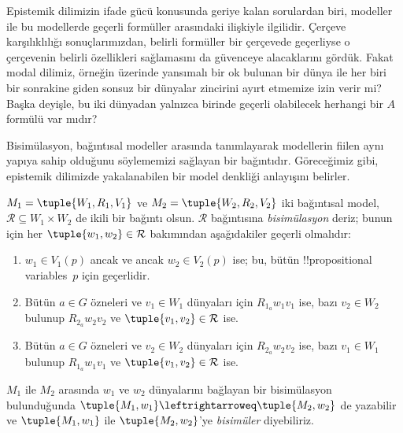



Epistemik dilimizin ifade gücü konusunda geriye kalan sorulardan biri,
modeller ile bu modellerde geçerli formüller arasındaki ilişkiyle ilgilidir.
Çerçeve karşılıklılığı sonuçlarımızdan, belirli formüller bir çerçevede
geçerliyse o çerçevenin belirli özellikleri sağlamasını da güvenceye
alacaklarını gördük. Fakat modal dilimiz, örneğin üzerinde yansımalı bir ok
bulunan bir dünya ile her biri bir sonrakine giden sonsuz bir dünyalar
zincirini ayırt etmemize izin verir mi? Başka deyişle, bu iki dünyadan
yalnızca birinde geçerli olabilecek herhangi bir $A$ formülü var mıdır?

Bisimülasyon, bağıntısal modeller arasında tanımlayarak modellerin fiilen aynı
yapıya sahip olduğunu söylememizi sağlayan bir bağıntıdır. Göreceğimiz gibi,
epistemik dilimizde yakalanabilen bir model denkliği anlayışını belirler.

\begin{defn}[Bisimülasyon]
$M_1 = \tuple{W_1, R_1, V_1}$ ve $M_2 = \tuple{W_2, R_2, V_2}$ iki
bağıntısal model, $\mathcal{R} \subseteq W_1 \times W_2$ de ikili bir bağıntı
olsun. $\mathcal{R}$ bağıntısına \emph{bisimülasyon} deriz; bunun için her
$\tuple{w_1, w_2} \in \mathcal{R}$ bakımından aşağıdakiler geçerli olmalıdır:

\begin{enumerate}
  \item $w_1 \in V_1(p)$ ancak ve ancak $w_2 \in V_2(p)$ ise; bu, bütün
  !!{propositional variable}s~$p$ için geçerlidir.
  \item Bütün $a \in G$ özneleri ve $v_1 \in W_1$ dünyaları için
  $R_{1_a} w_1 v_1$ ise, bazı $v_2 \in W_2$ bulunup $R_{2_a} w_2 v_2$ ve
  $\tuple{v_1, v_2} \in \mathcal{R}$ ise.
  \item Bütün $a \in G$ özneleri ve $v_2 \in W_2$ dünyaları için
   $R_{2_a} w_2 v_2$ ise, bazı $v_1 \in W_1$ bulunup $R_{1_a} w_1 v_1$ ve
   $\tuple{v_1, v_2} \in \mathcal{R}$ ise.
\end{enumerate}

$M_1$ ile $M_2$ arasında $w_1$ ve $w_2$ dünyalarını bağlayan bir bisimülasyon
bulunduğunda $\tuple{M_1, w_1} \leftrightarroweq \tuple{M_2, w_2}$ de
yazabilir ve $\tuple{M_1, w_1}$ ile $\tuple{M_2, w_2}$'ye
\emph{bisimüler} diyebiliriz.
\end{defn}

